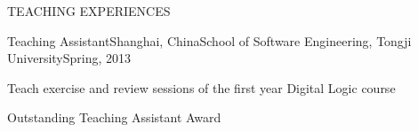 \documentclass{resume} %
\begin{document}
\begin{rSection}{TEACHING EXPERIENCES}

  \begin{rSubsection}{Teaching Assistant}{Shanghai, China}{School of Software Engineering, Tongji University}{Spring, 2013}
  \item Teach exercise and review sessions of the first year Digital Logic course
    \item Outstanding Teaching Assistant Award
  \end{rSubsection}

\end{rSection}

\end{document}
